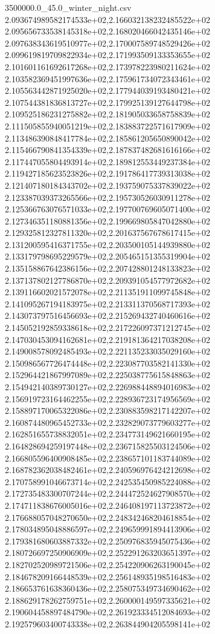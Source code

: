 \begin{filecontents*}{3500000.0_45.0_winter_night.csv}
2.093674989582174533e+02,2.166032138232485522e+02
2.095656733538145318e+02,2.168020466042435146e+02
2.097638343619510977e+02,2.170007589748529426e+02
2.099619819709822934e+02,2.171993509133353655e+02
2.101601161692617268e+02,2.173978223980211624e+02
2.103582369451997636e+02,2.175961734072343461e+02
2.105563442871925020e+02,2.177944039193480421e+02
2.107544381836813727e+02,2.179925139127644798e+02
2.109525186231275882e+02,2.181905033658758839e+02
2.111505855940051219e+02,2.183883722571617909e+02
2.113486390848417784e+02,2.185861205650890042e+02
2.115466790841354339e+02,2.187837482681616166e+02
2.117447055804493914e+02,2.189812553449237384e+02
2.119427185623523826e+02,2.191786417739313038e+02
2.121407180184343702e+02,2.193759075337839022e+02
2.123387039373265566e+02,2.195730526030911278e+02
2.125366763076571033e+02,2.197700769605071400e+02
2.127346351180881356e+02,2.199669805847042880e+02
2.129325812327811320e+02,2.201637567678617415e+02
2.131200595416371755e+02,2.203500105144939880e+02
2.133179798695229579e+02,2.205465151355319904e+02
2.135158867642386156e+02,2.207428801248133823e+02
2.137137802127786870e+02,2.209391054577972682e+02
2.139116602021572078e+02,2.211351911099745848e+02
2.141095267194183975e+02,2.213311370568717393e+02
2.143073797516456693e+02,2.215269432740460616e+02
2.145052192859338618e+02,2.217226097371212745e+02
2.147030453094162681e+02,2.219181364217038208e+02
2.149008578092485493e+02,2.221135233035029160e+02
2.150986567726474448e+02,2.223087703582141330e+02
2.152964421867997089e+02,2.225038775615848863e+02
2.154942140389730127e+02,2.226988448894016983e+02
2.156919723164462255e+02,2.228936723174956569e+02
2.158897170065322086e+02,2.230883598217142207e+02
2.160874480965452733e+02,2.232829073779603277e+02
2.162851655738832051e+02,2.234773149621660195e+02
2.164828694259197448e+02,2.236715825503124506e+02
2.166805596400908485e+02,2.238657101183744089e+02
2.168782362038482461e+02,2.240596976424212698e+02
2.170758991046673714e+02,2.242535450985224088e+02
2.172735483300707244e+02,2.244472524627908570e+02
2.174711838676005016e+02,2.246408197113723872e+02
2.176688057048270650e+02,2.248342468204618854e+02
2.178034895048886597e+02,2.249659991894413906e+02
2.179381680603887332e+02,2.250976835945075436e+02
2.180726697250906909e+02,2.252291263203651397e+02
2.182702520989721506e+02,2.254220906263190045e+02
2.184678209166448539e+02,2.256148935198516483e+02
2.186653761638360436e+02,2.258075349734690462e+02
2.188629178262759751e+02,2.260000149597335621e+02
2.190604458897484790e+02,2.261923334512084693e+02
2.192579603400743338e+02,2.263844904205598141e+02

\end{filecontents*}

